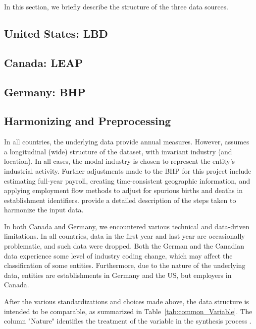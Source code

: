 
In this section, we briefly describe the structure of the three data sources.%

\subsection{United States: \acf{LBD}}



\subsection{Canada: \acf{LEAP}}



\subsection{Germany: \acf{BHP}}



\subsection{Harmonizing and Preprocessing}

In all countries, the underlying data provide annual measures. However, \SynLBD{} assumes a longitudinal (wide) structure of the dataset, with invariant industry (and location). In all cases, the modal industry is chosen to represent the entity's industrial activity. 
%
Further adjustments made to the \ac{BHP} for this project include estimating full-year payroll, creating time-consistent geographic information, and applying employment flow methods \citep{RePEc:iab:iabfme:201006_en} to adjust for spurious births and deaths in establishment identifiers. \citet{SJIAOS-2014b} provide a detailed description of the steps taken to harmonize the input data. 


In both Canada and Germany, we encountered various technical and data-driven limitations. In all countries, data in the first year and last year are occasionally problematic, and such data  were dropped. 
%
Both the German and the Canadian data experience some level of industry coding change, which may affect the classification of some entities. Furthermore, due to the nature of the underlying data, entities are establishments in Germany and the US, but employers in Canada. 

After the various standardizations and choices made above, the data structure is intended to be comparable, as summarized in Table~\ref{tab:common_Variable}. The column "Nature" identifies the treatment of the variable in the synthesis process \SynLBD. 

%

